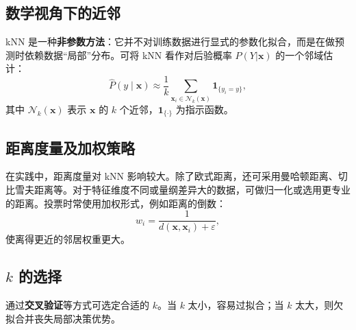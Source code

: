 \documentclass[11pt]{article}
\begin{document}
\begin{CJK}{UTF8}{gbsn}
\subsection{数学视角下的近邻}

kNN 是一种\textbf{非参数方法}：它并不对训练数据进行显式的参数化拟合，而是在做预测时依赖数据“局部”分布。可将 kNN 看作对后验概率 \(P(Y|\mathbf{x})\) 的一个邻域估计：
\[
\hat{P}(y \mid \mathbf{x}) 
\approx \frac{1}{k}\sum_{\mathbf{x}_i \in \mathcal{N}_k(\mathbf{x})} \mathbf{1}_{\{y_i = y\}},
\]
其中 \(\mathcal{N}_k(\mathbf{x})\) 表示 \(\mathbf{x}\) 的 \(k\) 个近邻，\(\mathbf{1}_{\{\cdot\}}\) 为指示函数。

\subsection{距离度量及加权策略}

在实践中，距离度量对 kNN 影响较大。除了欧式距离，还可采用曼哈顿距离、切比雪夫距离等。对于特征维度不同或量纲差异大的数据，可做归一化或选用更专业的距离。投票时常使用加权形式，例如距离的倒数：
\[
w_i = \frac{1}{d(\mathbf{x}, \mathbf{x}_i) + \varepsilon},
\]
使离得更近的邻居权重更大。

\subsection{\(k\) 的选择}

通过\textbf{交叉验证}等方式可选定合适的 \(k\)。当 \(k\) 太小，容易过拟合；当 \(k\) 太大，则欠拟合并丧失局部决策优势。



\end{CJK}
\end{document}

